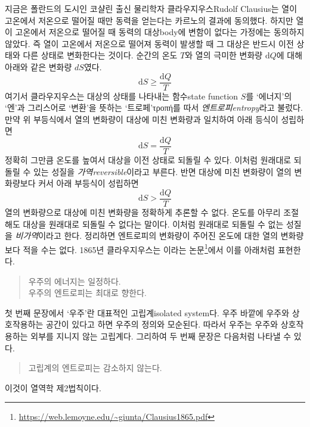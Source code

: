 \documentclass[a4paper,chapter,atbegshi]{oblivoir}
\begin{document}
지금은 폴란드의 도시인 코샬린 출신 물리학자 클라우지우스{\tiny Rudolf Clausius}는
열이 고온에서 저온으로 떨어질 때만 동력을 얻는다는 카르노의 결과에 동의했다. 
하지만 열이 고온에서 저온으로 떨어질 때 동력의 대상{\tiny body}에 변함이 없다는
가정에는 동의하지 않았다. 즉 열이 고온에서 저온으로 떨어져 동력이 발생할 때 그
대상은 반드시 이전 상태와 다른 상태로 변화한다는 것이다. 순간의 온도 $T$와 열의
극미한 변화량 $\textrm{d}Q$에 대해 아래와 같은 변화량 $dS$였다. 
\begin{equation}
  \textrm{d}S \geq \frac{\textrm{d}Q}{T}
\end{equation}
여기서 클라우지우스는 대상의 상태를 나타내는 함수{\tiny state function} $S$를
`에너지'의 `엔'과 그리스어로 `변환'을 뜻하는 `트로페'{\tiny τροπή}를 따서
\emph{엔트로피\tiny entropy}라고 불렀다. 만약 위 부등식에서 열의 변화량이
대상에 미친 변화량과 일치하여 아래 등식이 성립하면  
\begin{equation}
  \textrm{d}S = \frac{\textrm{d}Q}{T}
\end{equation}
정확히 그만큼 온도를 높여서 대상을 이전 상태로 되돌릴 수 있다. 이처럼
원래대로 되돌릴 수 있는 성질을 \emph{가역\tiny reversible}이라고 부른다.
반면 대상에 미친 변화량이 열의 변화량보다 커서 아래 부등식이 성립하면
\begin{equation}
  \textrm{d}S > \frac{\textrm{d}Q}{T}
\end{equation}
열의 변화량으로 대상에 미친 변화량을 정확하게 추론할 수 없다. 온도를
아무리 조절해도 대상을 원래대로 되돌릴 수 없다는 말이다. 이처럼 원래대로
되돌릴 수 없는 성질을 \emph{비가역}이라고 한다. 정리하면 엔트로피의
변화량이 주어진 온도에 대한 열의 변화량보다 적을 수는 없다. 1865년
클라우지우스는 이라는 
논문\footnote{\url{https://web.lemoyne.edu/~giunta/Clausius1865.pdf}}에서 
이를 아래처럼 표현한다.
\begin{quote}
  우주의 에너지는 일정하다. \\
  우주의 엔트로피는 최대로 향한다.
\end{quote}
첫 번째 문장에서 `우주'란 대표적인 고립계{\tiny isolated system}다. 우주
바깥에 우주와 상호작용하는 공간이 있다고 하면 우주의 정의와 모순된다. 
따라서 우주는 우주와 상호작용하는 외부를 지니지 않는 고립계다. 그리하여
두 번째 문장은 다음처럼 나타낼 수 있다.
\begin{quote}
  고립계의 엔트로피는 감소하지 않는다.
\end{quote}
이것이 열역학 제2법칙이다.
\end{document}
